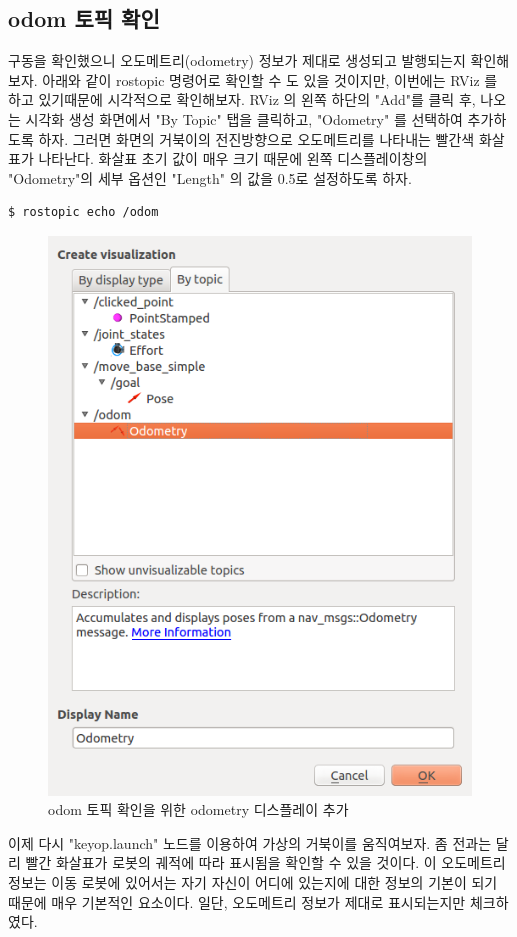 \subsection{odom 토픽 확인}

구동을 확인했으니 오도메트리(odometry) 정보가 제대로 생성되고 발행되는지 확인해보자. 아래와 같이 rostopic 명령어로 확인할 수 도 있을 것이지만, 이번에는 RViz 를 하고 있기때문에 시각적으로 확인해보자. RViz 의 왼쪽 하단의 "Add"를 클릭 후, 나오는 시각화 생성 화면에서 "By Topic" 탭을 클릭하고, "Odometry" 를 선택하여 추가하도록 하자. 그러면 화면의 거북이의 전진방향으로 오도메트리를 나타내는 빨간색 화살표가 나타난다. 화살표 초기 값이 매우 크기 때문에 왼쪽 디스플레이창의 "Odometry"의 세부 옵션인 "Length" 의 값을 0.5로 설정하도록 하자.

\vspace{\baselineskip}
\begin{lstlisting}[language=ROS]
$ rostopic echo /odom
\end{lstlisting}

\begin{figure}[h]
\centering\includegraphics[width=0.5\columnwidth]{pictures/chapter10/rviz_odom.png}
\caption{odom 토픽 확인을 위한 odometry 디스플레이 추가}
\end{figure}

이제 다시 "keyop.launch" 노드를 이용하여 가상의 거북이를 움직여보자. 좀 전과는 달리 빨간 화살표가 로봇의 궤적에 따라 표시됨을 확인할 수 있을 것이다. 이 오도메트리 정보는 이동 로봇에 있어서는 자기 자신이 어디에 있는지에 대한 정보의 기본이 되기 때문에 매우 기본적인 요소이다. 일단, 오도메트리 정보가 제대로 표시되는지만 체크하였다.

